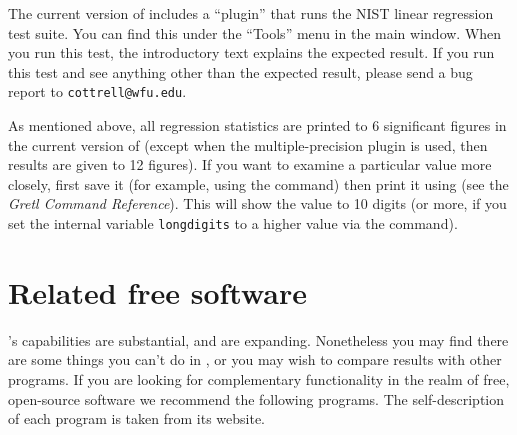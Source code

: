 The current version of  includes a ``plugin'' that runs the
NIST linear regression test suite.  You can find this under the
``Tools'' menu in the main window.  When you run this test, the
introductory text explains the expected result.  If you run this test
and see anything other than the expected result, please send a bug
report to \verb+cottrell@wfu.edu+.  

As mentioned above, all regression statistics are printed to 6
significant figures in the current version of  (except when
the multiple-precision plugin is used, then results are given to 12
figures).  If you want to examine a particular value more closely,
first save it (for example, using the  command) then print
it using  (see the \emph{Gretl Command Reference}).
This will show the value to 10 digits (or more, if you set the
internal variable \texttt{longdigits} to a higher value via the
 command).

\chapter{Related free software}
\label{app-advanced}

's capabilities are substantial, and are expanding.
Nonetheless you may find there are some things you can't do in
, or you may wish to compare results with other programs.
If you are looking for complementary functionality in the realm of
free, open-source software we recommend the following programs.  The
self-description of each program is taken from its website.

